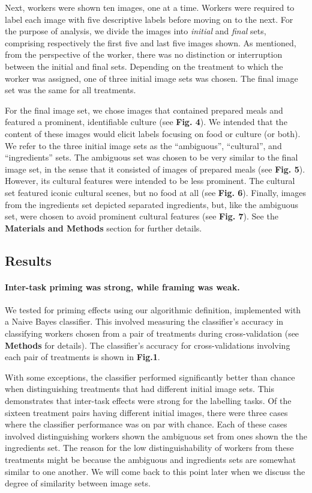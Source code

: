\documentclass[a4paper]{report}
\begin{document}
Next, workers were
shown ten images, one at a time. Workers were required to label each image 
with five descriptive labels before moving on to the next.  For the purpose 
of analysis, we divide the images
into \textit{initial} and \textit{final} sets, comprising respectively the 
first five and last five images shown.  As mentioned, from the perspective of 
the worker, there was no 
distinction or interruption between the initial and final sets. 
Depending on the treatment to which the worker was assigned, one of three 
initial image sets was chosen. The final image set was the same for all 
treatments.

For the final image set, we chose 
images that contained prepared meals and featured a prominent, identifiable 
culture (see \textbf{Fig. 4}).  We intended that the content of these images 
would elicit labels focusing on food or culture (or both).
We refer to the three initial image sets as the ``ambiguous'', ``cultural'', 
and ``ingredients'' sets.  The ambiguous set was chosen to
be very similar to the final image set, in the sense that it consisted of
images of prepared meals (see \textbf{Fig. 5}).  However, its cultural 
features were intended to be less prominent.  The cultural set featured 
iconic cultural scenes, but no food at all (see \textbf{Fig. 6}).  Finally, 
images from the 
ingredients set depicted separated ingredients, but, 
like the ambiguous set, were chosen to avoid prominent cultural features (see 
\textbf{Fig. 7}).  See the \textbf{Materials and Methods} section for further 
details.

\subsection*{Results}
\paragraph{Inter-task priming was strong, while framing was weak.}
We tested for priming effects using our algorithmic definition, implemented 
with a Naive Bayes classifier.  This involved measuring the classifier's 
accuracy in classifying workers chosen from a pair of treatments during 
cross-validation (see \textbf{Methods} for details).  The classifier's accuracy
for cross-validations involving each pair of treatments is shown in 
\textbf{Fig.1}.

With some exceptions, the classifier performed significantly better 
than chance when distinguishing treatments that had different initial image 
sets.  This demonstrates that inter-task effects were strong for the labelling 
tasks.  Of the sixteen treatment pairs having different initial images, there 
were three cases where the classifier performance was on par with chance. 
Each of these cases involved distinguishing workers shown the ambiguous set 
from ones shown the the ingredients set.  The reason for the low 
distinguishability of workers from these treatments might be because
the ambiguous and ingredients sets are somewhat similar to one another.
We will come back to this point later when we discuss the degree of similarity 
between image sets.
\end{document}
